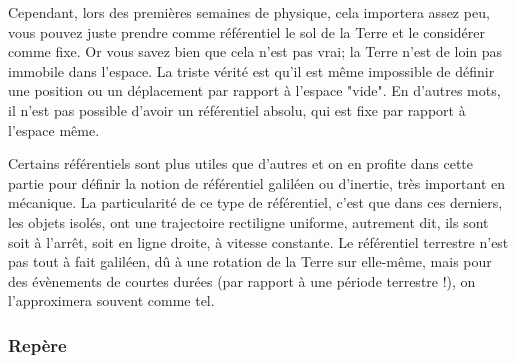 \documentclass{article}
\begin{document}
Cependant, lors des premières semaines de physique, cela importera assez peu, vous pouvez juste prendre comme référentiel le sol de la Terre et le considérer comme fixe. Or vous savez bien que cela n'est pas vrai; la Terre n'est de loin pas immobile dans l'espace. La triste vérité est qu'il est même impossible de définir une position ou un déplacement par rapport à l'espace "vide". En d'autres mots, il n'est pas possible d'avoir un référentiel absolu, qui est fixe par rapport à l'espace même.
\begin{tcolorbox}[title=Référentiel galiléen]
\indent Certains référentiels sont plus utiles que d'autres et on en profite dans cette partie pour définir la notion de référentiel galiléen ou d'inertie, très important en mécanique. La particularité de ce type de référentiel, c'est que dans ces derniers, les objets isolés, ont une trajectoire rectiligne uniforme, autrement dit, ils sont soit à l'arrêt, soit en ligne droite, à vitesse constante. Le référentiel terrestre n'est pas tout à fait galiléen, dû à une rotation de la Terre sur elle-même, mais pour des évènements de courtes durées (par rapport à une période terrestre !), on l'approximera souvent comme tel.
\end{tcolorbox}



\subsubsection{Repère}

\end{document}
